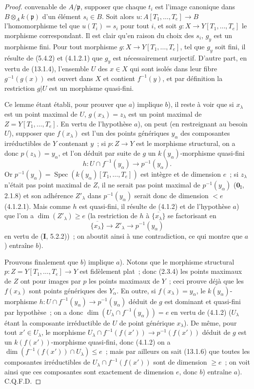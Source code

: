 \begin{proof}
convenable de $A/\mathfrak p$, supposer que chaque $t_i$ est l'image canonique
dans $B\otimes_Ak(\mathfrak p)$ d'un élément $s_i\in B$. Soit alors
$u:A[T_1,\ldots,T_e]\to B$ l'homomorphisme tel que $u(T_i)=s_i$ pour tout
$i$, et soit $g:X\to Y[T_1,\ldots,T_e]$ le morphisme correspondant. Il est
clair qu'en raison du choix des $s_i$, $g_y$ est un morphisme fini. Pour tout
morphisme $g:X\to Y[T_1,\ldots,T_e]$, tel que $g_y$ soit fini, il résulte de
(5.4.2) et (4.1.2.1) que $g_y$ est nécessairement surjectif. D'autre part, en
vertu de (13.1.4), l'ensemble $U$ des $x\in X$ qui sont isolés dans leur fibre
$g^{-1}(g(x))$ est ouvert dans $X$ et contient $f^{-1}(y)$, et par définition
la restriction $g|U$ est un morphisme quasi-fini.

Ce lemme étant établi, pour prouver que $a$) implique $b$), il reste à voir
que si $x_\lambda$ est un point maximal de $U$, $g(x_\lambda)=z_\lambda$ est
un point maximal de $Z=Y[T_1,\ldots,T_e]$. En vertu de l'hypothèse $a$), on
peut (en restreignant au besoin $U$), supposer que $f(x_\lambda)$ est l'un des
points génériques $y_\alpha$ des composantes irréductibles de $Y$ contenant
$y$~; si $p:Z\to Y$ est le morphisme structural, on a donc
$p(z_\lambda)=y_\alpha$, et l'on déduit par suite de $g$ un
$k(y_\alpha)$-morphisme quasi-fini
\[
  h:U\cap f^{-1}(y_\alpha)\longrightarrow p^{-1}(y_\alpha).
\]
Or $p^{-1}(y_\alpha)=\operatorname{Spec}(k(y_\alpha)[T_1,\ldots,T_e])$ est
intègre et de dimension $e$~; si $z_\lambda$ n'était pas point maximal de
$Z$, il ne serait pas point maximal de $p^{-1}(y_\alpha)$
($\mathbf 0_{\mathrm I}$, 2.1.8) et son adhérence $Z'_\lambda$ dans
$p^{-1}(y_\alpha)$ serait donc de dimension $<e$ (4.1.2.1). Mais comme $h$
est quasi-fini, il résulte de (4.1.2) et de l'hypothèse $a$) que l'on a
$\dim(Z'_\lambda)\geq e$ (la restriction de $h$ à
$\overline{\{x_\lambda\}}$ se factorisant en
\[
  \overline{\{x_\lambda\}}\longrightarrow Z'_\lambda
  \longrightarrow p^{-1}(y_\alpha)
\]
en vertu de (\textbf{I}, 5.2.2))~; on aboutit ainsi à une contradiction, ce
qui montre que $a$) entraîne $b$).

Prouvons finalement que $b$) implique $a$). Notons que le morphisme structural
$p:Z=Y[T_1,\ldots,T_e]\to Y$ est fidèlement plat~; donc (2.3.4) les points
maximaux de $Z$ ont pour images par $p$ les points maximaux de $Y$~; ceci
prouve déjà que les $f(x_\lambda)$ sont points génériques des $Y_\alpha$. En
outre, si $f(x_\lambda)=y_\alpha$, le $k(y_\alpha)$-morphisme
$h:U\cap f^{-1}(y_\alpha)\to p^{-1}(y_\alpha)$ déduit de $g$ est dominant et
quasi-fini par hypothèse~; on a donc
$\dim(U_\lambda\cap f^{-1}(y_\alpha))=e$ en vertu de (4.1.2)
($U_\lambda$ étant la composante irréductible de $U$ de point générique
$x_\lambda$). De même, pour tout $x'\in U_\lambda$, le morphisme
$U_\lambda\cap f^{-1}(f(x'))\to p^{-1}(f(x'))$ déduit de $g$ est un
$k(f(x'))$-morphisme quasi-fini, donc (4.1.2) on a
$\dim(f^{-1}(f(x'))\cap U_\lambda)\leq e$~; mais par ailleurs on sait (13.1.6)
que toutes les composantes irréductibles de
$U_\lambda\cap f^{-1}(f(x'))$ sont de dimension $\geq e$~; on voit ainsi que
ces composantes sont exactement de dimension $e$, donc $b$) entraîne $a$).
C.Q.F.D.
\end{proof}

